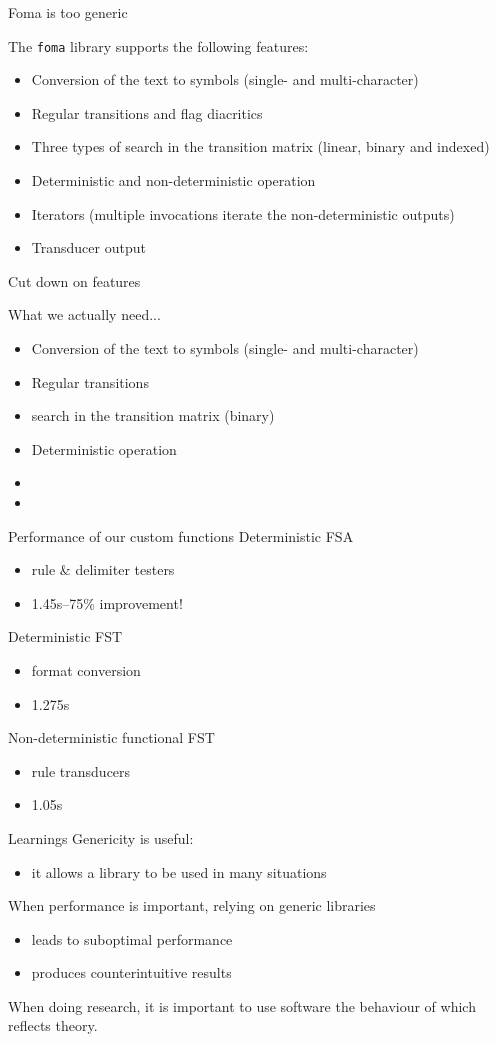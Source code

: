 \documentclass[utf8x,t,aspectratio=169]{beamer}
\newcommand{\vitem}{\item \vspace{4pt}}
\begin{document}
\begin{frame}{Foma is too generic}

The \texttt{foma} library supports the following features:
\begin{itemize}
  \vitem Conversion of the text to symbols (single- and multi-character)
  \vitem Regular transitions and flag diacritics
  \vitem Three types of search in the transition matrix (linear, binary and indexed)
  \vitem Deterministic and non-deterministic operation
  \vitem Iterators (multiple invocations iterate the non-deterministic outputs)
  \vitem Transducer output
\end{itemize}
\end{frame}

\begin{frame}{Cut down on features}

What we actually need...
\begin{itemize}
  \vitem Conversion of the text to symbols (single- and multi-character)
  \vitem Regular transitions 
  \vitem {} search in the transition matrix (binary)
  \vitem Deterministic operation
  \vitem {}
  \vitem {}
\end{itemize}

\end{frame}

\begin{frame}{Performance of our custom functions}
Deterministic FSA
\begin{itemize}
    \vitem rule \& delimiter testers
    \vitem 1.45s--75\% improvement!
\end{itemize}
Deterministic FST
\begin{itemize}
    \vitem format conversion
    \vitem 1.275s
\end{itemize}
Non-deterministic functional FST
\begin{itemize}
    \vitem rule transducers
    \vitem 1.05s
\end{itemize}

\end{frame}

\begin{frame}{Learnings}
Genericity is useful:
\begin{itemize}
    \vitem it allows a library to be used in many situations  %
\end{itemize}

When performance is important, relying on generic libraries
\begin{itemize}
    \vitem leads to suboptimal performance
    \vitem produces counterintuitive results
\end{itemize}

When doing research, it is important to use software the behaviour of which
reflects theory.

\end{frame}
\end{document}
